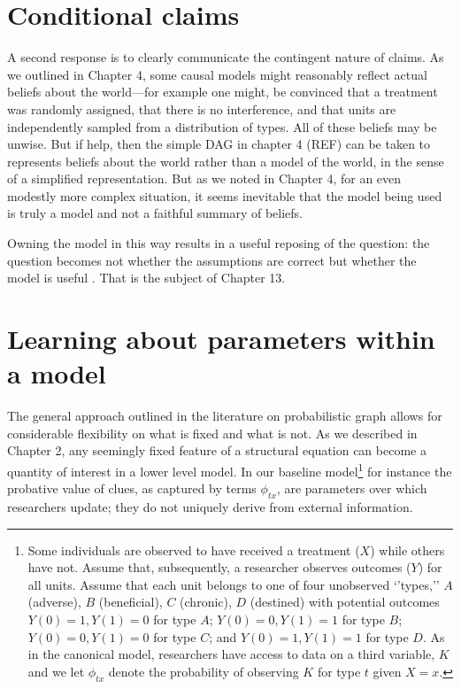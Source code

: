 \documentclass[12pt,]{book}
\let\rmarkdownfootnote\footnote%
\def\footnote{\protect\rmarkdownfootnote}
\begin{document}
\hypertarget{conditional-claims}{%
\section{Conditional claims}\label{conditional-claims}}

A second response is to clearly communicate the contingent nature of claims. As we outlined in Chapter 4, some causal models might reasonably reflect actual beliefs about the world---for example one might, be convinced that a treatment was randomly assigned, that there is no interference, and that units are independently sampled from a distribution of types. All of these beliefs may be unwise. But if help, then the simple DAG in chapter 4 (REF) can be taken to represents beliefs about the world rather than a model of the world, in the sense of a simplified representation. But as we noted in Chapter 4, for an even modestly more complex situation, it seems inevitable that the model being used is truly a model and not a faithful summary of beliefs.

Owning the model in this way results in a useful reposing of the question: the question becomes not whether the assumptions are correct but whether the model is useful \citep{clarke2012model}. That is the subject of Chapter 13.

\hypertarget{learning-about-parameters-within-a-model}{%
\section{Learning about parameters within a model}\label{learning-about-parameters-within-a-model}}

The general approach outlined in the literature on probabilistic graph allows for considerable flexibility on what is fixed and what is not. As we described in Chapter 2, any seemingly fixed feature of a structural equation can become a quantity of interest in a lower level model. In our baseline model\footnote{Some individuals are observed to have received a treatment (\(X\)) while others have not. Assume that, subsequently, a researcher observes outcomes (\(Y\)) for all units. Assume that each unit belongs to one of four unobserved `'types,'' \(A\) (adverse), \(B\) (beneficial), \(C\) (chronic), \(D\) (destined) with potential outcomes \(Y(0)=1, Y(1)=0\) for type \(A\); \(Y(0)=0, Y(1)=1\) for type \(B\); \(Y(0)=0, Y(1)=0\) for type \(C\); and \(Y(0)=1, Y(1)=1\) for type \(D\). As in the canonical model, researchers have access to data on a third variable, \(K\) and we let \(\phi_{tx}\) denote the probability of observing \(K\) for type \(t\) given \(X=x\).} for instance the probative value of clues, as captured by terms \(\phi_{tx}\), are parameters over which researchers update; they do not uniquely derive from external information.
\end{document}

